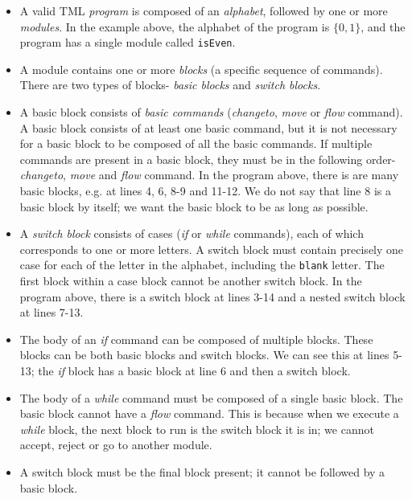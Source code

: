 \documentclass{article}
\theoremstyle{definition}
\begin{document}
    \begin{itemize}
        \item A valid TML \emph{program} is composed of an \emph{alphabet}, followed by one or more \emph{modules}. In the example above, the alphabet of the program is $\{0, 1\}$, and the program has a single module called \texttt{isEven}.
        \item A module contains one or more \emph{blocks} (a specific sequence of commands). There are two types of blocks- \emph{basic blocks} and \emph{switch blocks}.
        \item A basic block consists of \emph{basic commands} (\textit{changeto}, \textit{move} or \textit{flow} command). A basic block consists of at least one basic command, but it is not necessary for a basic block to be composed of all the basic commands. If multiple commands are present in a basic block, they must be in the following order- \textit{changeto}, \textit{move} and \textit{flow} command. In the program above, there is are many basic blocks, e.g. at lines 4, 6, 8-9 and 11-12. We do not say that line 8 is a basic block by itself; we want the basic block to be as long as possible.
        \item A \emph{switch block} consists of cases (\textit{if} or \textit{while} commands), each of which corresponds to one or more letters. A switch block must contain precisely one case for each of the letter in the alphabet, including the \texttt{blank} letter. The first block within a case block cannot be another switch block. In the program above, there is a switch block at lines 3-14 and a nested switch block at lines 7-13.
        \item The body of an \textit{if} command can be composed of multiple blocks. These blocks can be both basic blocks and switch blocks. We can see this at lines 5-13; the \textit{if} block has a basic block at line 6 and then a switch block.
        \item The body of a \textit{while} command must be composed of a single basic block. The basic block cannot have a \textit{flow} command. This is because when we execute a \textit{while} block, the next block to run is the switch block it is in; we cannot accept, reject or go to another module.
        \item A switch block must be the final block present; it cannot be followed by a basic block.
    \end{itemize}
    
\end{document}

